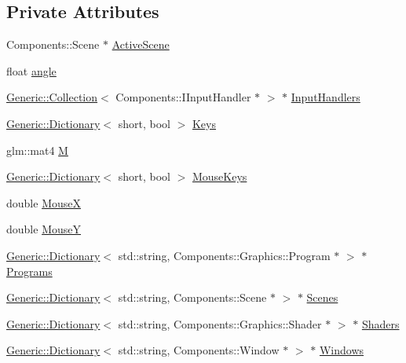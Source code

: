 \subsection*{Private Attributes}
\begin{DoxyCompactItemize}
\item 
Components\+::\+Scene $\ast$ \mbox{\hyperlink{classEngine_1_1BaseEngine_adb3dbc839da9d821e08b18d8a221698d}{Active\+Scene}}
\item 
float \mbox{\hyperlink{classApplication_1_1Engines_1_1ZPGEngine_adee8aa02ea2c15751eb6222bded1f729}{angle}}
\item 
\mbox{\hyperlink{classGeneric_1_1Collection}{Generic\+::\+Collection}}$<$ Components\+::\+I\+Input\+Handler $\ast$ $>$ $\ast$ \mbox{\hyperlink{classEngine_1_1BaseEngine_a134fa082c5a64d62b76ddf926647e7cc}{Input\+Handlers}}
\item 
\mbox{\hyperlink{classGeneric_1_1Dictionary}{Generic\+::\+Dictionary}}$<$ short, bool $>$ \mbox{\hyperlink{classEngine_1_1BaseEngine_a65321a97e83f0a6ee90df3efac2d3307}{Keys}}
\item 
glm\+::mat4 \mbox{\hyperlink{classApplication_1_1Engines_1_1ZPGEngine_a6e982d6b97e8d538cdf8df9a7f4c6cd0}{M}}
\item 
\mbox{\hyperlink{classGeneric_1_1Dictionary}{Generic\+::\+Dictionary}}$<$ short, bool $>$ \mbox{\hyperlink{classEngine_1_1BaseEngine_a3ee2bdddb66d45b8c808ffd937ba9c50}{Mouse\+Keys}}
\item 
double \mbox{\hyperlink{classEngine_1_1BaseEngine_a5fe085152ebe93346900407f6b41a034}{MouseX}}
\item 
double \mbox{\hyperlink{classEngine_1_1BaseEngine_a143c9c32dbbdc70bf1546ffe275bf384}{MouseY}}
\item 
\mbox{\hyperlink{classGeneric_1_1Dictionary}{Generic\+::\+Dictionary}}$<$ std\+::string, Components\+::\+Graphics\+::\+Program $\ast$ $>$ $\ast$ \mbox{\hyperlink{classEngine_1_1BaseEngine_ae0f86360ea3a384caefe443dd8f88601}{Programs}}
\item 
\mbox{\hyperlink{classGeneric_1_1Dictionary}{Generic\+::\+Dictionary}}$<$ std\+::string, Components\+::\+Scene $\ast$ $>$ $\ast$ \mbox{\hyperlink{classEngine_1_1BaseEngine_afd02af3c2fbe9bb734db014dec06585a}{Scenes}}
\item 
\mbox{\hyperlink{classGeneric_1_1Dictionary}{Generic\+::\+Dictionary}}$<$ std\+::string, Components\+::\+Graphics\+::\+Shader $\ast$ $>$ $\ast$ \mbox{\hyperlink{classEngine_1_1BaseEngine_a2582dee3f73da82bb422b43317b85e3b}{Shaders}}
\item 
\mbox{\hyperlink{classGeneric_1_1Dictionary}{Generic\+::\+Dictionary}}$<$ std\+::string, Components\+::\+Window $\ast$ $>$ $\ast$ \mbox{\hyperlink{classEngine_1_1BaseEngine_a4a1a4c4dae052e66ecc4f326eeed4d33}{Windows}}
\end{DoxyCompactItemize}


